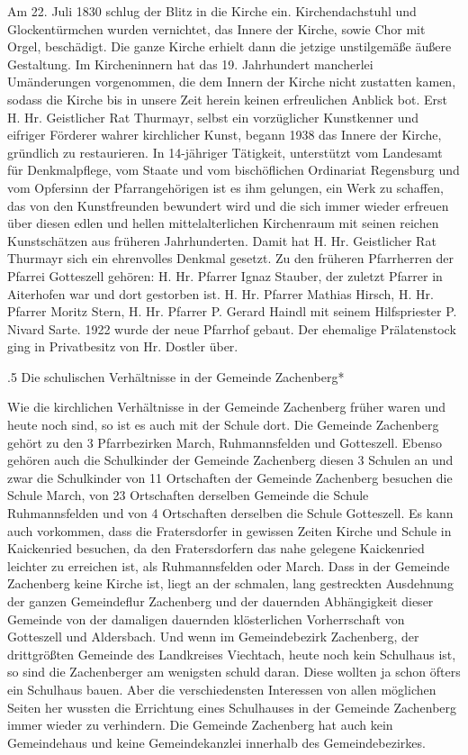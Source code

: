 Am 22. Juli 1830 schlug der Blitz in die Kirche ein. Kirchendachstuhl und
Glockentürmchen wurden vernichtet, das Innere der Kirche, sowie Chor mit Orgel,
beschädigt. Die ganze Kirche erhielt dann die jetzige unstilgemäße äußere
Gestaltung. Im Kircheninnern hat das 19. Jahrhundert mancherlei Umänderungen
vorgenommen, die dem Innern der Kirche nicht zustatten kamen, sodass die Kirche
bis in unsere Zeit herein keinen erfreulichen Anblick bot. Erst H. Hr.
Geistlicher Rat Thurmayr, selbst ein vorzüglicher Kunstkenner und eifriger
Förderer wahrer kirchlicher Kunst, begann 1938 das Innere der Kirche, gründlich
zu restaurieren. In 14-jähriger Tätigkeit, unterstützt vom Landesamt für
Denkmalpflege, vom Staate und vom bischöflichen Ordinariat Regensburg und vom
Opfersinn der Pfarrangehörigen ist es ihm gelungen, ein Werk zu schaffen, das
von den Kunstfreunden bewundert wird und die sich immer wieder erfreuen über
diesen edlen und hellen mittelalterlichen Kirchenraum mit seinen reichen
Kunstschätzen aus früheren Jahrhunderten. Damit hat H. Hr. Geistlicher Rat
Thurmayr sich ein ehrenvolles Denkmal gesetzt. Zu den früheren Pfarrherren der
Pfarrei Gotteszell gehören: H. Hr. Pfarrer Ignaz Stauber, der zuletzt Pfarrer in
Aiterhofen war und dort gestorben ist. H. Hr. Pfarrer Mathias Hirsch, H. Hr.
Pfarrer Moritz Stern, H. Hr. Pfarrer P. Gerard Haindl mit seinem Hilfspriester
P. Nivard Sarte. 1922 wurde der neue Pfarrhof gebaut. Der ehemalige
Prälatenstock ging in Privatbesitz von Hr. Dostler über.

.5 Die schulischen Verhältnisse in der Gemeinde Zachenberg*

Wie die kirchlichen Verhältnisse in der Gemeinde Zachenberg früher waren und
heute noch sind, so ist es auch mit der Schule dort. Die Gemeinde Zachenberg
gehört zu den 3 Pfarrbezirken March, Ruhmannsfelden und Gotteszell. Ebenso
gehören auch die Schulkinder der Gemeinde Zachenberg diesen 3 Schulen an und
zwar die Schulkinder von 11 Ortschaften der Gemeinde Zachenberg besuchen die
Schule March, von 23 Ortschaften derselben Gemeinde die Schule Ruhmannsfelden
und von 4 Ortschaften derselben die Schule Gotteszell. Es kann auch vorkommen,
dass die Fratersdorfer in gewissen Zeiten Kirche und Schule in Kaickenried
besuchen, da den Fratersdorfern das nahe gelegene Kaickenried leichter zu
erreichen ist, als Ruhmannsfelden oder March. Dass in der Gemeinde Zachenberg
keine Kirche ist, liegt an der schmalen, lang gestreckten Ausdehnung der ganzen
Gemeindeflur Zachenberg und der dauernden Abhängigkeit dieser Gemeinde von der
damaligen dauernden klösterlichen Vorherrschaft von Gotteszell und Aldersbach.
Und wenn im Gemeindebezirk Zachenberg, der drittgrößten Gemeinde des Landkreises
Viechtach, heute noch kein Schulhaus ist, so sind die Zachenberger am wenigsten
schuld daran. Diese wollten ja schon öfters ein Schulhaus bauen. Aber die
verschiedensten Interessen von allen möglichen Seiten her wussten die Errichtung
eines Schulhauses in der Gemeinde Zachenberg immer wieder zu verhindern. Die
Gemeinde Zachenberg hat auch kein Gemeindehaus und keine Gemeindekanzlei
innerhalb des Gemeindebezirkes.

